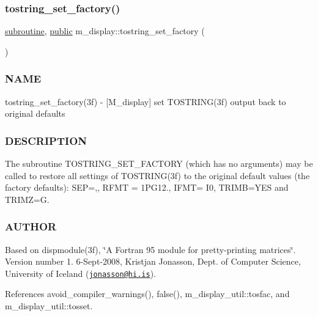 \subsubsection{\texorpdfstring{tostring\+\_\+set\+\_\+factory()}{tostring\_set\_factory()}}
{\footnotesize\ttfamily \hyperlink{M__stopwatch_83_8txt_acfbcff50169d691ff02d4a123ed70482}{subroutine}, \hyperlink{M__stopwatch_83_8txt_a2f74811300c361e53b430611a7d1769f}{public} m\+\_\+display\+::tostring\+\_\+set\+\_\+factory (\begin{DoxyParamCaption}{ }\end{DoxyParamCaption})}



\subsubsection*{N\+A\+ME}

tostring\+\_\+set\+\_\+factory(3f) -\/ \mbox{[}M\+\_\+display\mbox{]} set T\+O\+S\+T\+R\+I\+N\+G(3f) output back to original defaults 

\subsubsection*{D\+E\+S\+C\+R\+I\+P\+T\+I\+ON}

The subroutine T\+O\+S\+T\+R\+I\+N\+G\+\_\+\+S\+E\+T\+\_\+\+F\+A\+C\+T\+O\+RY (which has no arguments) may be called to restore all settings of T\+O\+S\+T\+R\+I\+N\+G(3f) to the original default values (the factory defaults)\+: S\+EP=\textquotesingle{},\textquotesingle{}, R\+F\+MT = \textquotesingle{}1\+P\+G12.\textquotesingle{}, I\+F\+MT= \textquotesingle{}I0\textquotesingle{}, T\+R\+I\+MB=\textquotesingle{}Y\+ES\textquotesingle{} and T\+R\+I\+MZ=\textquotesingle{}G\textquotesingle{}.

\subsubsection*{A\+U\+T\+H\+OR}

Based on dispmodule(3f), \char`\"{}\+A Fortran 95 module for pretty-\/printing matrices\char`\"{}. Version number 1. 6-\/\+Sept-\/2008, Kristjan Jonasson, Dept. of Computer Science, University of Iceland (\href{mailto:jonasson@hi.is}{\tt jonasson@hi.\+is}). 

References avoid\+\_\+compiler\+\_\+warnings(), false(), m\+\_\+display\+\_\+util\+::tosfac, and m\+\_\+display\+\_\+util\+::tosset.

